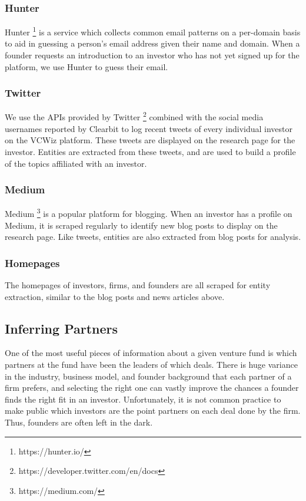 \subsubsection{Hunter}

Hunter \footnote{https://hunter.io/} is a service which collects common email patterns on a per-domain basis to aid in guessing a person's email address given their name and domain. When a founder requests an introduction to an investor who has not yet signed up for the platform, we use Hunter to guess their email.

\subsubsection{Twitter}

We use the APIs provided by Twitter \footnote{https://developer.twitter.com/en/docs} combined with the social media usernames reported by Clearbit to log recent tweets of every individual investor on the VCWiz platform. These tweets are displayed on the research page for the investor. Entities are extracted from these tweets, and are used to build a profile of the topics affiliated with an investor.

\subsubsection{Medium}

Medium \footnote{https://medium.com/} is a popular platform for blogging. When an investor has a profile on Medium, it is scraped regularly to identify new blog posts to display on the research page. Like tweets, entities are also extracted from blog posts for analysis.

\subsubsection{Homepages}

The homepages of investors, firms, and founders are all scraped for entity extraction, similar to the blog posts and news articles above.

\subsection{Inferring Partners}
\label{ch4:partners}

One of the most useful pieces of information about a given venture fund is which partners at the fund have been the leaders of which deals. There is huge variance in the industry, business model, and founder background that each partner of a firm prefers, and selecting the right one can vastly improve the chances a founder finds the right fit in an investor. Unfortunately, it is not common practice to make public which investors are the point partners on each deal done by the firm. Thus, founders are often left in the dark.

